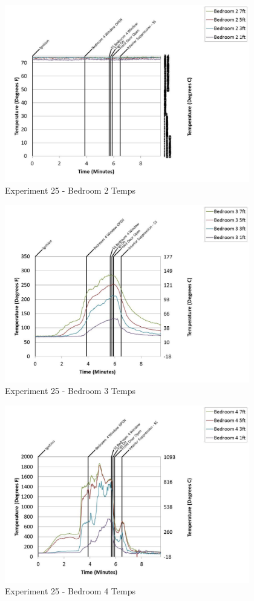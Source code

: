 \documentclass{article}
\begin{document}
\begin{appendices}
	\begin{figure}[h!]
		\centering
		\includegraphics[height=3.05in]{0_Images/Results_Charts/Exp_25_Charts/Bedroom2Temps.pdf}
		\caption{Experiment 25 - Bedroom 2 Temps}
	\end{figure}
 
	\clearpage

	\begin{figure}[h!]
		\centering
		\includegraphics[height=3.05in]{0_Images/Results_Charts/Exp_25_Charts/Bedroom3Temps.pdf}
		\caption{Experiment 25 - Bedroom 3 Temps}
	\end{figure}
 

	\begin{figure}[h!]
		\centering
		\includegraphics[height=3.05in]{0_Images/Results_Charts/Exp_25_Charts/Bedroom4Temps.pdf}
		\caption{Experiment 25 - Bedroom 4 Temps}
	\end{figure}
 

\end{appendices}
\end{document}
